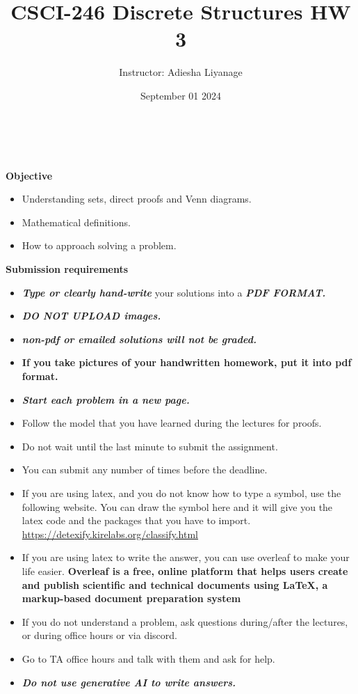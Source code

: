 \documentclass[12pt]{exam}
\title{CSCI-246 Discrete Structures HW 3}
\author{Instructor: Adiesha Liyanage}
\date{September 01 2024}
\begin{document}
\maketitle

\hrulefill
\\
\\
\textbf{Objective}
\begin{itemize}
    \item Understanding sets, direct proofs and Venn diagrams.
    \item Mathematical definitions.
    \item How to approach solving a problem.
\end{itemize}

\textbf{Submission requirements}
\begin{itemize}
    \item \textbf{\textit{Type or clearly hand-write}} your solutions into a \textbf{\textit{PDF FORMAT.}} 
    \item \textbf{\textit{DO NOT UPLOAD images.}}
    \item \textbf{\textit{non-pdf or emailed solutions will not be graded.}}
    \item \textbf{If you take pictures of your handwritten homework, put it into pdf format.}
    \item \textbf{\textit{Start each problem in a new page.}}
    \item Follow the model that you have learned during the lectures for proofs.
    \item Do not wait until the last minute to submit the assignment.
    \item You can submit any number of times before the deadline. 
    \item If you are using latex, and you do not know how to type a symbol, use the following website. You can draw the symbol here and it will give you the latex code and the packages that you have to import. \url{https://detexify.kirelabs.org/classify.html}
    \item If you are using latex to write the answer, you can use overleaf to make your life easier. \textbf{Overleaf is a free, online platform that helps users create and publish scientific and technical documents using LaTeX, a markup-based document preparation system}
    \item If you do not understand a problem, ask questions during/after the lectures, or during office hours or via discord.
    \item Go to TA office hours and talk with them and ask for help.
    \item \textbf{\textit{Do not use generative AI to write answers.}} 
\end{itemize}
\end{document}
